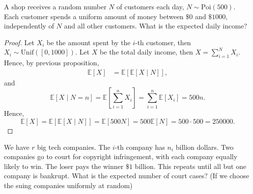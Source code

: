 \begin{eg}
    A shop receives a random number \(N\) of customers each day, \(N \sim \mathrm{Poi}(500) \). Each customer spends a uniform amount of money between \(\$ 0\) and \(\$ 1000\), independently of \(N\) and all other customers. What is the expected daily income?    
\end{eg}

\begin{proof}
    Let \(X_i\) be the amount spent by the \(i\)-th customer, then \(X_i \sim \mathrm{Unif}([0, 1000]) \). Let \(X\) be the total daily income, then \(X = \sum_{i=1}^N X_i \). Hence, by previous proposition,
    \begin{align*}
        \mathbb{E} [X] &= \mathbb{E} [\mathbb{E} [X \mid N]],
    \end{align*}
    and 
    \[
        \mathbb{E} [X \mid N = n] = \mathbb{E} \left[ \sum_{i=1}^n X_i  \right]  = \sum_{i=1}^n \mathbb{E} [X_i] = 500n. 
    \]
    Hence,
    \[
        \mathbb{E} [X] = \mathbb{E} [\mathbb{E} [X \mid N]] = \mathbb{E} [500 N] = 500 \mathbb{E} [N] = 500 \cdot 500 = 250000.
    \]
\end{proof}

\begin{eg}
    We have \(r\) big tech companies. The \(i\)-th company has \(n_i\) billion dollars. Two companies go to court for copyright infringement, with each company equally likely to win. The loser pays the winner \(\$ 1\) billion. This repeats until all but one company is bankrupt. What is the expected number of court cases? (If we choose the suing companies uniformly at random) 
\end{eg}

